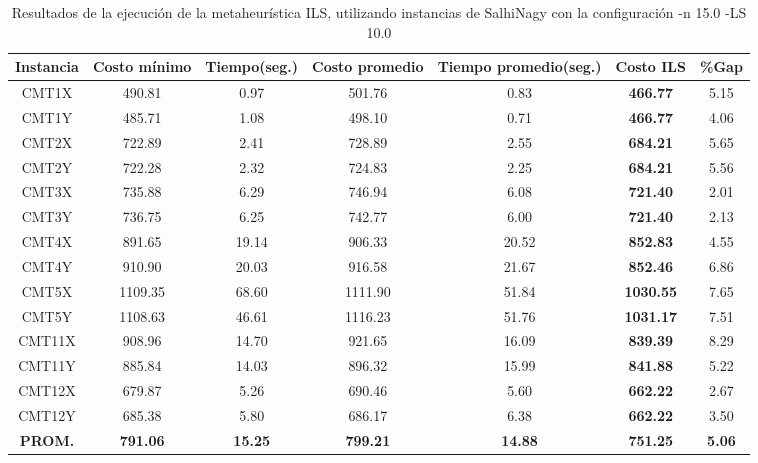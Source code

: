 \begin{table}[ht]
\caption{Resultados de la ejecución de la metaheurística ILS, utilizando instancias de SalhiNagy con la configuración -n 15.0 -LS 10.0}
\centering
\small
\begin{tabular}{c c c c c c c}
\hline\hline
Instancia & Costo mínimo & Tiempo(seg.) & Costo promedio & Tiempo promedio(seg.) & Costo ILS & \%Gap \\ [0.5ex]
\hline
CMT1X & 490.81 & 0.97 & 
501.76 & 0.83 & \bf{466.77} & 
5.15\\CMT1Y & 485.71 & 1.08 & 
498.10 & 0.71 & \bf{466.77} & 
4.06\\CMT2X & 722.89 & 2.41 & 
728.89 & 2.55 & \bf{684.21} & 
5.65\\CMT2Y & 722.28 & 2.32 & 
724.83 & 2.25 & \bf{684.21} & 
5.56\\CMT3X & 735.88 & 6.29 & 
746.94 & 6.08 & \bf{721.40} & 
2.01\\CMT3Y & 736.75 & 6.25 & 
742.77 & 6.00 & \bf{721.40} & 
2.13\\CMT4X & 891.65 & 19.14 & 
906.33 & 20.52 & \bf{852.83} & 
4.55\\CMT4Y & 910.90 & 20.03 & 
916.58 & 21.67 & \bf{852.46} & 
6.86\\CMT5X & 1109.35 & 68.60 & 
1111.90 & 51.84 & \bf{1030.55} & 
7.65\\CMT5Y & 1108.63 & 46.61 & 
1116.23 & 51.76 & \bf{1031.17} & 
7.51\\CMT11X & 908.96 & 14.70 & 
921.65 & 16.09 & \bf{839.39} & 
8.29\\CMT11Y & 885.84 & 14.03 & 
896.32 & 15.99 & \bf{841.88} & 
5.22\\CMT12X & 679.87 & 5.26 & 
690.46 & 5.60 & \bf{662.22} & 
2.67\\CMT12Y & 685.38 & 5.80 & 
686.17 & 6.38 & \bf{662.22} & 
3.50\\\bf{PROM.} & 
\bf{791.06} & \bf{15.25} & \bf{799.21} & \bf{14.88} & \bf{751.25} & \bf{5.06}\\[1ex]\hline
\end{tabular}
\label{table:nonlin}
\end{table} \clearpage
